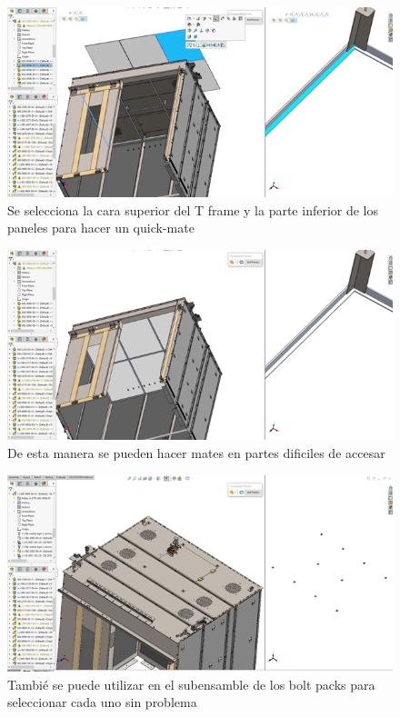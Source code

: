 \documentclass{report}
\begin{document}
\begin{figure}[H]
	\centering
	\includegraphics[width=0.85\linewidth, height=0.5\textheight,keepaspectratio]{Imagenes/solidworks_componentpreview_05}
	\caption{Se selecciona la cara superior del T frame y la parte inferior de los paneles para hacer un quick-mate}
	\label{fig:solidworkscomponentpreview05}
\end{figure}

\begin{figure}[H]
	\centering
	\includegraphics[width=0.85\linewidth, height=0.5\textheight,keepaspectratio]{Imagenes/solidworks_componentpreview_06}
	\caption{De esta manera se pueden hacer mates en partes dificiles de accesar}
	\label{fig:solidworkscomponentpreview06}
\end{figure}

\begin{figure}[H]
	\centering
	\includegraphics[width=0.85\linewidth, height=0.5\textheight,keepaspectratio]{Imagenes/solidworks_componentpreview_07}
	\caption{Tambié se puede utilizar en el subensamble de los bolt packs para seleccionar cada uno sin problema}
	\label{fig:solidworkscomponentpreview07}
\end{figure}
\end{document}

